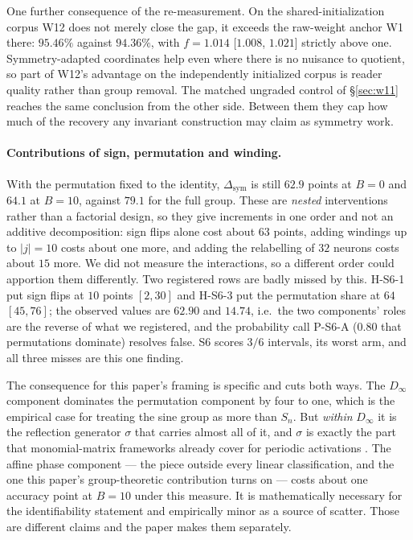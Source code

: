 \documentclass[10pt,twocolumn,letterpaper]{article}
\theoremstyle{definition}
\newcommand{\Dinf}{D_\infty}
\begin{document}
One further consequence of the re-measurement. On the shared-initialization corpus W12 does not
merely close the gap, it exceeds the raw-weight anchor W1 there: $95.46\%$ against $94.36\%$, with
$f = 1.014$ [$1.008$, $1.021$] strictly above one. Symmetry-adapted coordinates help even where
there is no nuisance to quotient, so part of W12's advantage on the independently initialized
corpus is reader quality rather than group removal. The matched ungraded control of
\S\ref{sec:w11} reaches the same conclusion from the other side. Between them they cap how much of
the recovery any invariant construction may claim as symmetry work.

\paragraph{Contributions of sign, permutation and winding.} With the permutation
fixed to the identity, $\Delta_{\mathrm{sym}}$ is still $62.9$ points at $B=0$ and $64.1$ at
$B=10$, against $79.1$ for the full group. These are \emph{nested} interventions rather than a
factorial design, so they give increments in one order and not an additive decomposition: sign
flips alone cost about $63$ points, adding windings up to $|j|=10$ costs about one more, and adding
the relabelling of $32$ neurons costs about $15$ more. We did not measure the interactions, so a
different order could apportion them differently. Two registered rows are badly missed by this. H-S6-1 put sign flips at $10$ points
$[2,30]$ and H-S6-3 put the permutation share at $64$ $[45,76]$; the observed values are $62.90$ and
$14.74$, i.e.\ the two components' roles are the reverse of what we registered, and the probability
call P-S6-A ($0.80$ that permutations dominate) resolves false. S6 scores $3/6$ intervals, its worst
arm, and all three misses are this one finding.

The consequence for this paper's framing is specific and cuts both ways. The $\Dinf$ component
dominates the permutation component by four to one, which is the empirical case for treating the
sine group as more than $S_n$. But \emph{within} $\Dinf$ it is the reflection generator $\sigma$
that carries almost all of it, and $\sigma$ is exactly the part that monomial-matrix frameworks
already cover for periodic activations \citep{tran2024monomial}. The affine phase component ---
the piece outside every linear classification, and the one this paper's group-theoretic
contribution turns on --- costs about one accuracy point at $B=10$ under this measure. It is
mathematically necessary for the identifiability statement and empirically minor as a source of
scatter. Those are different claims and the paper makes them separately.
\end{document}
